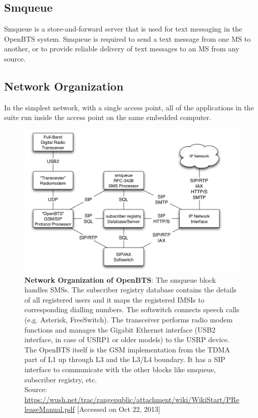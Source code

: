 \subsection{Smqueue}
Smqueue is a store-and-forward server that is used for text messaging in the OpenBTS system. Smqueue is required to send a text message from one MS to another, or to provide reliable delivery of text messages to an MS from any source.

\subsection{Network Organization}
In the simplest network, with a single access point, all of the applications in the suite run inside the access point on the same embedded computer.



\begin{figure}
\centering
\includegraphics[width=1\textwidth]{networkOrg}
\caption[Network Organization of OpenBTS]{\textbf{Network Organization of OpenBTS}: The smqueue block handles SMSs.
The subscriber registry database contains the details of all registered users and it
maps the registered IMSIs to corresponding dialling numbers. The softswitch connects
speech calls (e.g. Asterisk, FreeSwitch). The transceiver performs radio modem
functions and manages the Gigabit Ethernet interface (USB2 interface, in case
of USRP1 or older models) to the USRP device. The OpenBTS itself is the GSM
implementation from the TDMA part of L1 up through L3 and the L3/L4 boundary.
It has a SIP interface to communicate with the other blocks like smqueue, subscriber
registry, etc. \\
\footnotesize{Source: \url{https://wush.net/trac/rangepublic/attachment/wiki/WikiStart/PReleaseManual.pdf} [Accessed on Oct 22, 2013]}
}
\label{networkOrg}
\end{figure}

